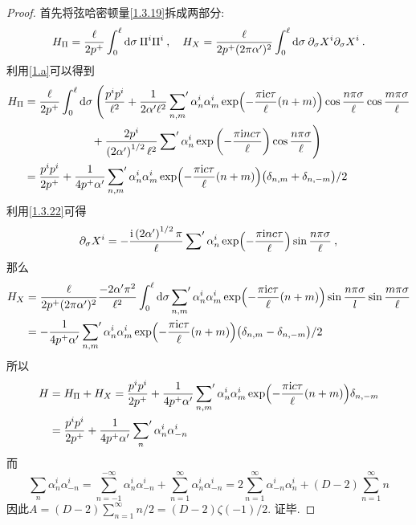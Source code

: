 \begin{proof}
    首先将弦哈密顿量\eqref{1.3.19}拆成两部分:
\begin{align*}
    H_{\Pi}=\frac{\ell}{2 p^+} \int_{0}^{\ell} \mathrm{d} \sigma \: \Pi^{i} \Pi^{i}\:, \quad 
    H_{X}=\frac{\ell}{2p^{+}(2 \pi \alpha^\prime)^{2} } \int_{0}^{\ell} \mathrm{d} \sigma \:\partial_{\sigma} X^{i} \partial_{\sigma} X^{i} \:.
\end{align*}  
利用\eqref{1.a}可以得到
\begin{align*}
H_\Pi&=\frac{\ell}{2 p^+} \int_{0}^{\ell} \mathrm{d} \sigma \:
\Biggl( \frac{p^{i} p^{i}}{\ell^{2}}
+\frac{1}{2 \alpha^\prime \ell^2} \sideset{}{'}\sum_{n,m} \alpha_{n}^{i} \alpha_{m}^{i}\exp\Bigl(-\frac{\pi \mathrm{i} c \tau}{\ell}(n+m)\Bigr)  \cos \frac{n \pi \sigma}{\ell} \cos \frac{m\pi \sigma}{\ell}  \\
&\qquad \qquad\qquad  +\frac{2p^{i}}{\left(2 \alpha^{\prime}\right)^{1 / 2 } \ell^{2}} \sideset{}{'}\sum \alpha_{n}^{i} \exp \left(-\frac{\pi \mathrm{i} n c \tau}{\ell}\right) \cos \frac{n \pi \sigma}{\ell} \Biggr) \\
&=\frac{p^{i}p^{i}}{2p^{+}}+\frac{1}{4p^{+}\alpha'}\sideset{}{'}\sum_{n,m} \alpha_{n}^{i} \alpha_{m}^{i}\exp\Bigl(-\frac{\pi \mathrm{i} c \tau}{\ell}(n+m)\Bigr)\bigl(\delta_{n,m}+\delta_{n,-m}\bigr)/2
\end{align*}
利用\eqref{1.3.22}可得
\begin{align*}
\partial_\sigma X^{i} =-\frac{\mathrm{i}\left(2 \alpha^{\prime}\right)^{1 / 2} \pi}{\ell} \sideset{}{'}\sum \alpha_{n}^{i} \exp \Bigl(-\frac{\pi \mathrm{i} n c \tau}{\ell}\Bigr) \sin \frac{n \pi \sigma}{\ell} \:,
\end{align*}
那么
\begin{align*}
H_X &=\frac{\ell}{2p^{+}(2 \pi \alpha^\prime)^{2} } \frac{-2 \alpha^\prime \pi^2}{\ell^2} \int_{0}^{\ell} \mathrm{d} \sigma \sideset{}{'}\sum _{n,m} \alpha_{n}^{i}\alpha_{m}^{i} 
\exp \Bigl(-\frac{\pi \mathrm{i} c \tau}{\ell}(n+m)\Bigr) \sin \frac{n \pi \sigma}{l}\sin \frac{m \pi \sigma}{\ell} \\
&=-\frac{1}{4p^{+}\alpha^\prime }  \sideset{}{'}\sum _{n,m} \alpha_{n}^{i}\alpha_{m}^{i} 
\exp \Bigl(-\frac{\pi \mathrm{i} c \tau}{\ell}(n+m)\Bigr) \bigl(\delta_{n,m}-\delta_{n,-m}\bigr)/2
\end{align*}
所以
\begin{align*}
    H&=H_{\Pi}+H_{X}=\frac{p^{i}p^{i}}{2p^{+}} +\frac{1}{4p^{+}\alpha'}\sideset{}{'}\sum_{n,m} \alpha_{n}^{i} \alpha_{m}^{i}\exp\Bigl(-\frac{\pi \mathrm{i} c \tau}{\ell}(n+m)\Bigr)\delta_{n,-m} \\
    &=\frac{p^{i}p^{i}}{2p^{+}} +\frac{1}{4p^{+}\alpha'}\sideset{}{'}\sum_{n} \alpha_{n}^{i} \alpha_{-n}^{i}
\end{align*}
而
\[
\sum_{n} \alpha_{n}^{i} \alpha_{-n}^{i}=\sum_{n=-1}^{-\infty} \alpha_{n}^{i} \alpha_{-n}^{i}+\sum_{n=1}^{\infty} \alpha_{n}^{i} \alpha_{-n}^{i}=2 \sum_{n=1}^{\infty} \alpha_{-n}^{i} \alpha_{n}^{i}+(D-2)\sum_{n=1}^{\infty} n
\]
因此$A=(D-2)\sum_{n=1}^{\infty}n/2=(D-2)\zeta(-1)/2$. 证毕.
\end{proof}
